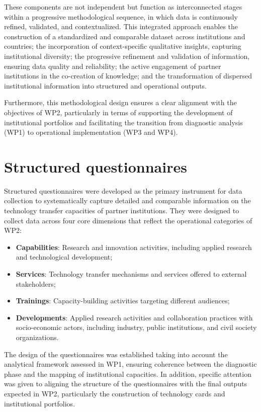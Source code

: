 \documentclass[
  12pt,
  oneside]{book}
\providecommand{\tightlist}{%
  \setlength{\itemsep}{0pt}\setlength{\parskip}{0pt}}
\begin{document}
These components are not independent but function as interconnected
stages within a progressive methodological sequence, in which data is
continuously refined, validated, and contextualized. This integrated
approach enables the construction of a standardized and comparable
dataset across institutions and countries; the incorporation of
context-specific qualitative insights, capturing institutional
diversity; the progressive refinement and validation of information,
ensuring data quality and reliability; the active engagement of partner
institutions in the co-creation of knowledge; and the transformation of
dispersed institutional information into structured and operational
outputs.

Furthermore, this methodological design ensures a clear alignment with
the objectives of WP2, particularly in terms of supporting the
development of institutional portfolios and facilitating the transition
from diagnostic analysis (WP1) to operational implementation (WP3 and
WP4).

\section{Structured questionnaires}\label{structured-questionnaires}

Structured questionnaires were developed as the primary instrument for
data collection to systematically capture detailed and comparable
information on the technology transfer capacities of partner
institutions. They were designed to collect data across four core
dimensions that reflect the operational categories of WP2:

\begin{itemize}
\tightlist
\item
  \textbf{Capabilities}: Research and innovation activities, including
  applied research and technological development;
\item
  \textbf{Services}: Technology transfer mechanisms and services offered
  to external stakeholders;
\item
  \textbf{Trainings}: Capacity-building activities targeting different
  audiences;
\item
  \textbf{Developments}: Applied research activities and collaboration
  practices with socio-economic actors, including industry, public
  institutions, and civil society organizations.
\end{itemize}

The design of the questionnaires was established taking into account the
analytical framework assessed in WP1, ensuring coherence between the
diagnostic phase and the mapping of institutional capacities. In
addition, specific attention was given to aligning the structure of the
questionnaires with the final outputs expected in WP2, particularly the
construction of technology cards and institutional portfolios.
\end{document}
